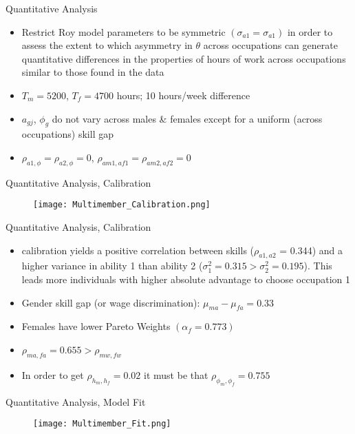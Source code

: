 \documentclass[hyperref={bookmarks=false}]{beamer}
\begin{document}
\begin{frame}{Quantitative Analysis}
\begin{itemize}
\setlength{\itemsep}{0.35 cm}
\item Restrict Roy model parameters to be symmetric $(\sigma_{a1}=\sigma_{a1})$ in order to assess the extent to which asymmetry in $\theta$ across occupations can generate quantitative differences in the properties of hours of work across occupations similar to those found in the data
\item $T_m=5200$, $T_f=4700$ hours; 10 hours/week difference
\item $a_{gj}$, $\phi_{g}$ do not vary across males \& females except for a uniform (across occupations) skill gap
\item $\rho_{a1,\phi}=\rho_{a2,\phi}=0$, $\rho_{am1,af1}=\rho_{am2,af2}=0$ 
\end{itemize}
\end{frame}

\begin{frame}{Quantitative Analysis, Calibration}
\begin{figure}[!t]
\centering
\begin{minipage}[b]{0.65\textwidth}{}
\centering
\texttt{[image: Multimember\_Calibration.png]}
\end{minipage}
\end{figure}
\end{frame}

\begin{frame}{Quantitative Analysis, Calibration}
\begin{itemize}
\setlength{\itemsep}{0.25 cm}
\item calibration yields a positive correlation
between skills ($\rho_{a1,a2}$ = 0.344) and a higher variance in ability 1 than ability 2
($\sigma^2_1 = 0.315 > \sigma^2_
2 = 0.195$). This leads more individuals with higher absolute advantage to
choose occupation 1
\item Gender skill gap (or wage discrimination): $\mu_{ma}-\mu_{fa}=0.33$
\item Females have lower Pareto Weights $(\alpha_f=0.773)$
\item $\rho_{ma,fa}=0.655>\rho_{mw,fw}$
\item In order to get $\rho_{h_{m},h_{f}}=0.02$ it must be that $\rho_{\phi_{m},\phi_{f}}=0.755$
\end{itemize}
\end{frame}

\begin{frame}{Quantitative Analysis, Model Fit}
\begin{figure}[!t]
\centering
\begin{minipage}[b]{0.65\textwidth}{}
\centering
\texttt{[image: Multimember\_Fit.png]}
\end{minipage}
\end{figure}
\end{frame}
\end{document}
